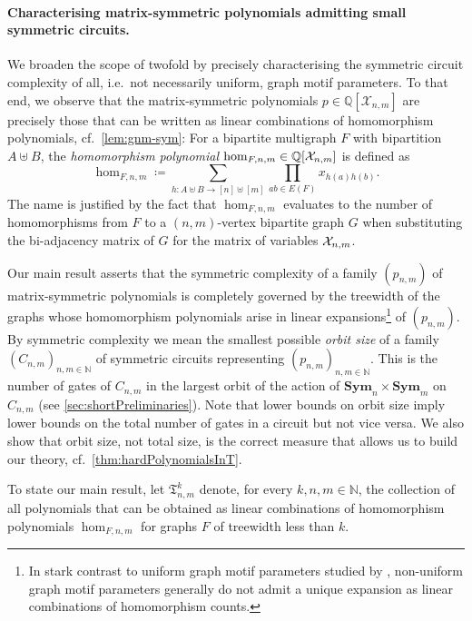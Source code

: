 \documentclass[10pt,a4paper]{article}
\theoremstyle{definition}
\theoremstyle{plain}
\theoremstyle{remark}
\newcommand{\Xx}{{\cal X}}
\newcommand{\Sym}{\mathbf{Sym}}
\newcommand{\bbN}{\mathbb{N}}
\newcommand{\bbQ}{\mathbb{Q}}
\begin{document}
\paragraph{Characterising matrix-symmetric polynomials admitting small symmetric circuits.}
We broaden the scope of \cite{curticapean_homomorphisms_2017} twofold by precisely characterising the symmetric circuit complexity of all, i.e.\ not necessarily uniform, graph motif parameters.
To that end, we observe that the matrix-symmetric polynomials $p \in \mathbb{Q}[\mathcal{X}_{n,m}]$ are precisely those that can be written as linear combinations of homomorphism polynomials, cf.\ \cref{lem:gnm-sym}:
For a bipartite multigraph   $F$  with bipartition $A \uplus B$, the \emph{homomorphism polynomial} $\hom_{F,n,m} \in \bbQ[\Xx_{n,m}]$ is defined as
\[
\hom_{F,n,m} \coloneqq \sum_{h \colon A \uplus B \to [n] \uplus [m]} \prod_{ab \in E(F)} x_{h(a)h(b)}.
\]
The name is justified by the fact that $\hom_{F,n,m}$ evaluates to the number of homomorphisms from $F$ to a $(n,m)$-vertex bipartite graph $G$ when substituting the bi-adjacency matrix  of $G$ for the matrix of variables $\Xx_{n,m}$.


Our main result asserts that the symmetric complexity of a family $(p_{n,m})$ of matrix-symmetric polynomials is completely governed by the treewidth of the graphs whose homomorphism polynomials arise in linear expansions\footnote{In stark contrast to uniform graph motif parameters studied by \textcite{curticapean_homomorphisms_2017}, non-uniform graph motif parameters generally do not admit a unique expansion as linear combinations of homomorphism counts.} of $(p_{n,m})$.
By symmetric complexity we mean the smallest possible \emph{orbit size} of a family $(C_{n,m})_{n,m \in \bbN}$ of symmetric circuits representing $(p_{n,m})_{n,m \in \bbN}$. This is the number of gates of $C_{n,m}$ in
the largest orbit of the action of $\Sym_n \times \Sym_m$ on $C_{n,m}$ (see \cref{sec:shortPreliminaries}). 
Note that lower bounds on orbit size imply lower bounds on the total number of gates in a circuit but not vice versa. 
We also show that orbit size, not total size, is the correct measure that allows us to build our theory, cf.\ \cref{thm:hardPolynomialsInT}.

To state our main result, let $\mathfrak{T}_{n,m}^k$ denote, for every $k,n,m \in \bbN$, the collection of all polynomials that can be obtained as linear combinations of homomorphism polynomials $\hom_{F,n,m}$ for graphs $F$ of treewidth less than $k$.
\end{document}
